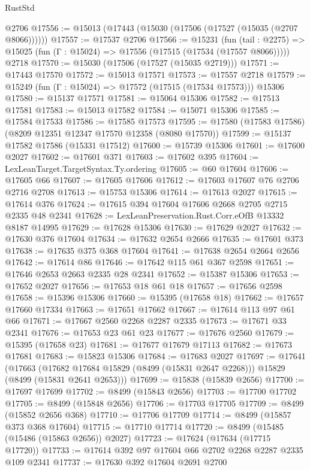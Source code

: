 \begin{lexlean}{RustStd}
\begin{coremodule}
    @2706
@17556 := @15013 (@17443 (@15030 (@17506 (@17527 (@15035 (@2707 @8066))))))
@17557 := @17537 @2706
@17566 := @15231
    (fun (tail : @2275) => @15025 (fun (Γ : @15024) => @17556 (@17515 (@17534 (@17557 @8066)))))
    @2718
@17570 := @15030 (@17506 (@17527 (@15035 @2719)))
@17571 := @17443 @17570
@17572 := @15013 @17571
@17573 := @17557 @2718
@17579 := @15249 (fun (Γ : @15024) => @17572 (@17515 (@17534 @17573))) @15306
@17580 := @15137 @17571
@17581 := @15064 @15306
@17582 := @17513 @17581
@17583 := @15013 @17582
@17584 := @15071 @15306
@17585 := @17584 @17533
@17586 := @17585 @17573
@17595 := @17580 (@17583 @17586) (@8209 @12351 @12347 @17570 @12358 (@8080 @17570))
@17599 := @15137 @17582 @17586 (@15331 @17512)
@17600 := @15739 @15306
@17601 := @17600 @2027
@17602 := @17601 @371
@17603 := @17602 @395
@17604 := LexLeanTarget.TargetSyntax.Ty.ordering
@17605 := @60 @17604
@17606 := @17605 @66
@17607 := @17605 @17606
@17612 := @17603 @17607 @76 @2706 @2716 @2708
@17613 := @15753 @15306
@17614 := @17613 @2027
@17615 := @17614 @376
@17624 := @17615 @394 @17604 @17606 @2668 @2705 @2715 @2335 @48 @2341
@17628 := LexLeanPreservation.Rust.Corr.eOfB @13332 @8187 @14995
@17629 := @17628 @15306
@17630 := @17629 @2027
@17632 := @17630 @376 @17604
@17634 := @17632 @2654 @2666
@17635 := @17601 @373
@17638 := @17635 @375 @368 @17604
@17641 := @17638 @2654 @2664 @2656
@17642 := @17614 @86
@17646 := @17642 @115 @61 @367 @2598
@17651 := @17646 @2653 @2663 @2335 @28 @2341
@17652 := @15387 @15306
@17653 := @17652 @2027
@17656 := @17653 @18 @61 @18
@17657 := @17656 @2598
@17658 := @15396 @15306
@17660 := @15395 (@17658 @18)
@17662 := @17657 @17660 @17334
@17663 := @17651 @17662
@17667 := @17614 @113 @97 @61 @66
@17671 := @17667 @2560 @2268 @2287 @2335
@17673 := @17671 @33 @2341
@17676 := @17653 @23 @61 @23
@17677 := @17676 @2560
@17679 := @15395 (@17658 @23)
@17681 := @17677 @17679 @17113
@17682 := @17673 @17681
@17683 := @15823 @15306
@17684 := @17683 @2027
@17697 := @17641
    (@17663 (@17682 @17684 @15829 (@8499 (@15831 @2647 @2268))) @15829 (@8499 (@15831 @2641 @2653)))
@17699 := @15838 (@15839 @2656)
@17700 := @17697 @17699
@17702 := @8499 (@15843 @2656)
@17703 := @17700 @17702
@17705 := @8499 (@15848 @2656)
@17706 := @17703 @17705
@17709 := @8499 (@15852 @2656 @368)
@17710 := @17706 @17709
@17714 := @8499 (@15857 @373 @368 @17604)
@17715 := @17710 @17714
@17720 := @8499 (@15485 (@15486 (@15863 @2656)) @2027)
@17723 := @17624 (@17634 (@17715 @17720))
@17733 := @17614 @392 @97 @17604 @66 @2702 @2268 @2287 @2335 @109 @2341
@17737 := @17630 @392 @17604 @2691 @2700

\end{coremodule}
\end{lexlean}
